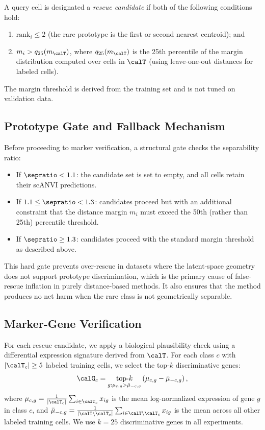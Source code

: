 A query cell is designated a \emph{rescue candidate} if both of the following conditions hold:
\begin{enumerate}[leftmargin=*]
    \item $\text{rank}_i \leq 2$ (the rare prototype is the first or second nearest centroid); and
    \item $m_i > q_{25}(m_{\calT})$, where $q_{25}(m_{\calT})$ is the 25th percentile of the margin distribution computed over cells in $\calT$ (using leave-one-out distances for labeled cells).
\end{enumerate}
The margin threshold is derived from the training set and is not tuned on validation data.

\subsection{Prototype Gate and Fallback Mechanism}
\label{sec:gate}

Before proceeding to marker verification, a structural gate checks the separability ratio:
\begin{itemize}[leftmargin=*]
    \item If $\sepratio < 1.1$: the candidate set is set to empty, and all cells retain their scANVI predictions.
    \item If $1.1 \leq \sepratio < 1.3$: candidates proceed but with an additional constraint that the distance margin $m_i$ must exceed the 50th (rather than 25th) percentile threshold.
    \item If $\sepratio \geq 1.3$: candidates proceed with the standard margin threshold as described above.
\end{itemize}

This hard gate prevents over-rescue in datasets where the latent-space geometry does not support prototype discrimination, which is the primary cause of false-rescue inflation in purely distance-based methods. It also ensures that the method produces no net harm when the rare class is not geometrically separable.

\subsection{Marker-Gene Verification}
\label{sec:marker}

For each rescue candidate, we apply a biological plausibility check using a differential expression signature derived from $\calT$. For each class $c$ with $|\calT_c| \geq 5$ labeled training cells, we select the top-$k$ discriminative genes:
\begin{equation}
    \calG_c = \underset{g : \mu_{c,g} > \bar{\mu}_{-c,g}}{\text{top-}k} \left(\mu_{c,g} - \bar{\mu}_{-c,g}\right),
    \label{eq:markers}
\end{equation}
where $\mu_{c,g} = \frac{1}{|\calT_c|}\sum_{i \in \calT_c} x_{ig}$ is the mean log-normalized expression of gene $g$ in class $c$, and $\bar{\mu}_{-c,g} = \frac{1}{|\calT \setminus \calT_c|}\sum_{i \in \calT \setminus \calT_c} x_{ig}$ is the mean across all other labeled training cells. We use $k = 25$ discriminative genes in all experiments.

